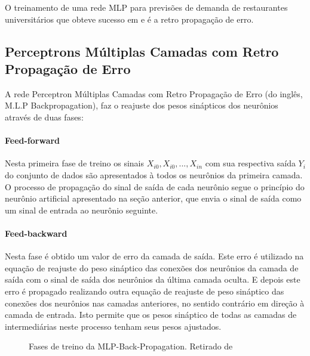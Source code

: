 \documentclass[	12pt, Times, openright, twoside, a4paper, english, brazil]{abntex2}
\begin{document}
        O treinamento de uma rede MLP para previsões de demanda de restaurantes universitários que obteve sucesso em \cite{Lopes2008} e \cite{Rocha2011} é a retro propagação de erro.
        \subsection{Perceptrons Múltiplas Camadas com Retro Propagação de Erro}
        A rede Perceptron Múltiplas Camadas com Retro Propagação de Erro (do inglês, M.L.P Backpropagation), faz o reajuste dos pesos sinápticos dos neurônios através de duas fases:
  	       \paragraph{Feed-forward} Nesta primeira fase de treino os sinais $X_{i0},X_{i0},...,X_{in}$ com sua respectiva saída $Y_i$ do conjunto de dados são apresentados à todos os neurônios da primeira camada. O processo de propagação do sinal de saída de cada neurônio segue o princípio do neurônio artificial apresentado na seção anterior, que envia o sinal de saída como um sinal de entrada ao neurônio seguinte.
  	       
  	       \paragraph{Feed-backward} Nesta fase é obtido um valor de erro da camada de saída. Este erro é utilizado na equação de reajuste do peso sináptico das conexões dos neurônios da camada de saída com o sinal de saída dos neurônios da última camada oculta. E depois este erro é propagado realizando outra equação de reajuste de peso sináptico das conexões dos neurônios nas camadas anteriores, no sentido contrário em direção à camada de entrada. Isto permite que os pesos sináptico de todas as camadas de intermediárias neste processo tenham seus pesos ajustados.
  	       
  	       \begin{figure}[!ht]
  	       	\caption{Fases de treino da MLP-Back-Propagation. Retirado de \cite{Almeida2013}\label{fig:MLP}}
  	       \end{figure}
  	       
\end{document}
